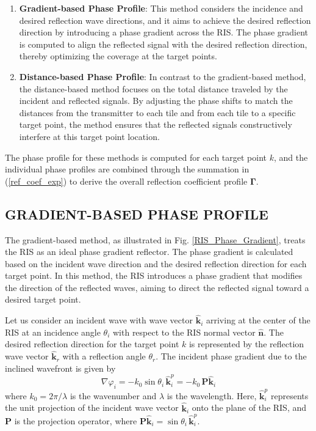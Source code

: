 \documentclass{IEEEoj}
\begin{document}
\begin{enumerate}
	\item \textbf{Gradient-based Phase Profile}: This method considers the incidence and desired reflection wave directions, and it aims to achieve the desired reflection direction by introducing a phase gradient across the RIS. The phase gradient is computed to align the reflected signal with the desired reflection direction, thereby optimizing the coverage at the target points.
	
	\item \textbf{Distance-based Phase Profile}: In contrast to the gradient-based method, the distance-based method focuses on the total distance traveled by the incident and reflected signals. By adjusting the phase shifts to match the distances from the transmitter to each tile and from each tile to a specific target point, the method ensures that the reflected signals constructively interfere at this target point location.
\end{enumerate}

The phase profile for these methods is computed for each target point $k$, and the individual phase profiles are combined through the summation in (\ref{ref_coef_exp}) to derive the overall reflection coefficient profile $\mathbf{\Gamma}$.

\subsection{GRADIENT-BASED PHASE PROFILE}
The gradient-based method, as illustrated in Fig. \ref{RIS_Phase_Gradient}, treats the RIS as an ideal phase gradient reflector. The phase gradient is calculated based on the incident wave direction and the desired reflection direction for each target point. In this method, the RIS introduces a phase gradient that modifies the direction of the reflected waves, aiming to direct the reflected signal toward a desired target point.

Let us consider an incident wave with wave vector $\mathbf{\hat{k}}_i$ arriving at the center of the RIS at an incidence angle $\theta_i$ with respect to the RIS normal vector $\mathbf{\hat{n}}$. The desired reflection direction for the target point $k$ is represented by the reflection wave vector $\mathbf{\hat{k}}_r$ with a reflection angle $\theta_r$. The incident phase gradient due to the inclined wavefront is given by
\begin{equation} \label{grad_phi_i}
	\nabla \varphi_i = - k_0 \sin\theta_i \, \mathbf{\hat{k}}_i^p = - k_0 \, \textbf{P} \mathbf{\hat{k}}_i
\end{equation}
where $k_0 = 2 \pi / \lambda$ is the wavenumber and $\lambda$ is the wavelength. Here, $\mathbf{\hat{k}}_i^p$ represents the unit projection of the incident wave vector $\mathbf{\hat{k}}_i$ onto the plane of the RIS, and $\textbf{P}$ is the projection operator, where $\textbf{P} \mathbf{\hat{k}}_i = \sin\theta_i \, \mathbf{\hat{k}}_i^p$.
\end{document}
